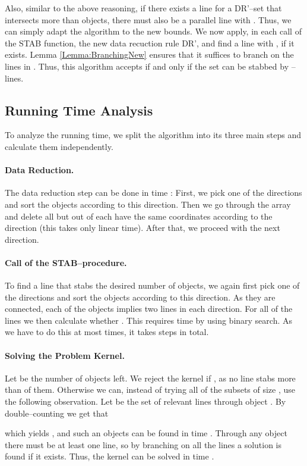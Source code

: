 \documentclass[12pt]{article}
\begin{document}
Also, similar to the above reasoning, if there exists a line for a DR'--set that intersects more than  objects, there must also be a parallel line  with . Thus, we can simply adapt the algorithm to the new bounds. We now apply, in each call of the STAB function, the new data recuction rule DR', and find a line  with , if it exists. Lemma \ref{Lemma:BranchingNew} ensures that it suffices to branch on the lines in . Thus, this algorithm accepts if and only if the set can be stabbed by  --lines.

\subsection{Running Time Analysis}
To analyze the running time, we split the algorithm into its three main steps and calculate them independently.
\paragraph{Data Reduction.}
The data reduction step can be done in time : First, we pick one of the  directions and sort the objects according to this direction. Then we go through the array and delete all but  out of each  have the same coordinates according to the direction (this takes only linear time). After that, we proceed with the next direction.
\paragraph{Call of the STAB--procedure.}
To find a line that stabs the desired number of objects, we again first pick one of the  directions and sort the objects according to this direction. As they are connected, each of the objects implies two lines in each direction. For all of the  lines  we then calculate whether . This requires  time by using binary search. As we have to do this at most  times, it takes  steps in total.
\paragraph{Solving the Problem Kernel.}
Let  be the number of objects left. We reject the kernel if , as no line stabs more than  of them. 
Otherwise we can, instead of trying all of the  subsets of size , use the following observation. Let  be the set of relevant lines through object . By double--counting we get that

which yields , and such an objects can be found in time . Through any object there must be at least one line, so by branching on all the  lines a solution is found if it exists. Thus, the kernel can be solved in time .
\end{document}
